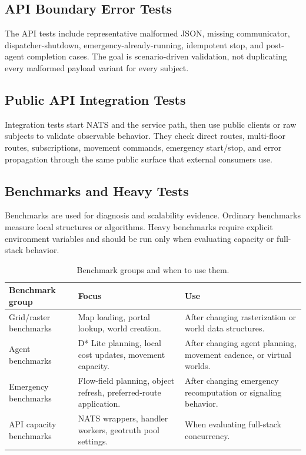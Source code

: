 \documentclass[12pt,a4paper]{report}
\begin{document}
\subsection{API Boundary Error Tests}

The API tests include representative malformed JSON, missing communicator,
dispatcher-shutdown, emergency-already-running, idempotent stop, and post-agent
completion cases. The goal is scenario-driven validation, not duplicating every
malformed payload variant for every subject.

\subsection{Public API Integration Tests}

Integration tests start NATS and the service path, then use public clients or raw
subjects to validate observable behavior. They check direct routes, multi-floor
routes, subscriptions, movement commands, emergency start/stop, and error
propagation through the same public surface that external consumers use.

\subsection{Benchmarks and Heavy Tests}

Benchmarks are used for diagnosis and scalability evidence. Ordinary benchmarks
measure local structures or algorithms. Heavy benchmarks require explicit
environment variables and should be run only when evaluating capacity or
full-stack behavior.

\begin{table}[H]
\centering
\begin{tabular}{|p{}|p{}|p{}|}
\hline
\textbf{Benchmark group} & \textbf{Focus} & \textbf{Use} \\
\hline
Grid/raster benchmarks &
Map loading, portal lookup, world creation. &
After changing rasterization or world data structures. \\
\hline
Agent benchmarks &
D* Lite planning, local cost updates, movement capacity. &
After changing agent planning, movement cadence, or virtual worlds. \\
\hline
Emergency benchmarks &
Flow-field planning, object refresh, preferred-route application. &
After changing emergency recomputation or signaling behavior. \\
\hline
API capacity benchmarks &
NATS wrappers, handler workers, geotruth pool settings. &
When evaluating full-stack concurrency. \\
\hline
\end{tabular}
\caption{Benchmark groups and when to use them.}
\end{table}
\end{document}
